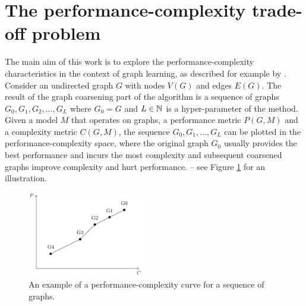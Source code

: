 \section{The performance-complexity trade-off problem}

The main aim of this work is to explore the performance-complexity characteristics in the context of graph learning, as described for example by \cite{prochazka_downstream_2022}. Consider an undirected graph \( G \) with nodes \( V \left( G \right) \) and edges \( E \left( G \right) \). The result of the graph coarsening part of the algorithm is a sequence of graphs \( G_0, G_1, G_2, \dots, G_L \) where \( G_0 = G \) and \( L \in \mathbb{N} \) is a hyper-parameter of the method.
Given a model \( M \) that operates on graphs, a performance metric \( P \left( G, M \right) \) and a complexity metric \( C \left( G, M \right) \), the sequence \( G_0, G_1, \dots, G_L \) can be plotted in the performance-complexity space, where the original graph \( G_0 \) usually provides the best performance and incurs the most complexity and subsequent coarsened graphs improve complexity and hurt performance. -- see Figure \ref{fig:performance-complexity} for an illustration.

\begin{figure}
  \centering
  \includegraphics[width=0.45\textwidth]{images/performance-complexity/performance-complexity.pdf}
  \caption{An example of a performance-complexity curve for a sequence of graphs.}
  \label{fig:performance-complexity}
\end{figure}

